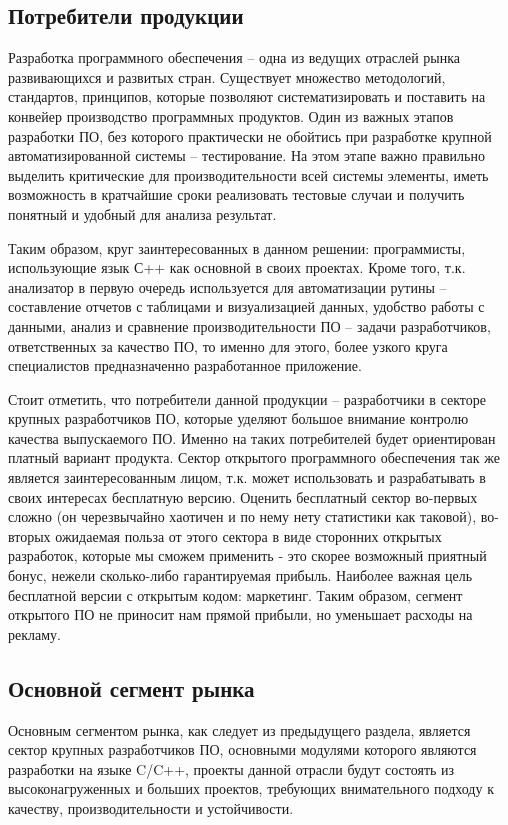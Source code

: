 \subsection{Потребители продукции}
	Разработка программного обеспечения -- одна из ведущих отраслей рынка развивающихся и развитых стран. Существует множество методологий, стандартов, принципов, которые позволяют систематизировать и поставить на конвейер производство программных продуктов. Один из важных этапов разработки ПО, без которого практически не обойтись при разработке крупной автоматизированной системы -- тестирование. На этом этапе важно правильно выделить критические для производительности всей системы элементы, иметь возможность в кратчайшие сроки реализовать тестовые случаи и получить понятный и удобный для анализа результат.
	
	Таким образом, круг заинтересованных в данном решении: программисты, использующие язык С++ как основной в своих проектах. Кроме того, т.к. анализатор в первую очередь используется для автоматизации рутины -- составление отчетов с таблицами и визуализацией данных, удобство работы с данными, анализ и сравнение производительности ПО -- задачи разработчиков, ответственных за качество ПО, то именно для этого, более узкого круга специалистов предназначенно разработанное приложение.
	
	Стоит отметить, что потребители данной продукции -- разработчики в секторе крупных разработчиков ПО, которые уделяют большое внимание контролю качества выпускаемого ПО. Именно на таких потребителей будет ориентирован платный вариант продукта. Сектор открытого программного обеспечения так же является заинтересованным лицом, т.к. может использовать и разрабатывать в своих интересах бесплатную версию. Оценить бесплатный сектор во-первых сложно (он черезвычайно хаотичен и по нему нету статистики как таковой), во-вторых ожидаемая польза от этого сектора в виде сторонних открытых разработок, которые мы сможем применить - это скорее возможный приятный бонус, нежели сколько-либо гарантируемая прибыль. Наиболее важная цель бесплатной версии с открытым кодом: маркетинг. Таким образом, сегмент открытого ПО не приносит нам прямой прибыли, но уменьшает расходы на рекламу.

\subsection{Основной сегмент рынка}
	Основным сегментом рынка, как следует из предыдущего раздела, является сектор крупных разработчиков ПО, основными модулями которого являются разработки на языке C/C++, проекты данной отрасли будут состоять из высоконагруженных и больших проектов, требующих внимательного подходу к качеству, производительности и устойчивости.

